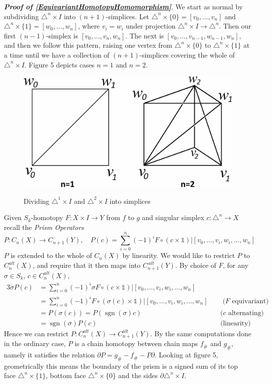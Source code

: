 \documentclass[11pt,a4paper,twoside]{article}
\theoremstyle{plain}
\theoremstyle{definition}
\theoremstyle{definition}
\theoremstyle{definition}
\theoremstyle{definition}
\theoremstyle{definition}
\DeclareMathOperator{\sgn}{sgn}
\begin{document}
\textbf{\emph{Proof of \ref{EquivariantHomotopyHomomorphism}}}.
We start as normal by subdividing $\triangle^n\times I$ into $(n\!+\!1)$-simplices. Let $\triangle^n\times\{0\}=[v_0,\dots,v_n]$ and $\triangle^n\times\{1\}=[w_0,\dots,w_n]$, where $v_i=w_i$ under projection $\triangle^n\times I\rightarrow\triangle^n$. Then our first $(n\!-\!1)$-simplex is $[v_0,\dots,v_n,w_n]$. The next is $[v_0,\dots,v_{n\!-\!1},w_{n\!-\!1},w_n]$, and then we follow this pattern, raising one vertex from $\triangle^n\!\times\!\{0\}$ to $\triangle^n\!\times\!\{1\}$ at a time until we have a collection of $(n\!+\!1)$-simplices covering the whole of $\triangle^n\times I$. Figure 5 depicts cases $n\!=\!1$ and $n\!=\!2$.
\begin{figure}
\centering
\includegraphics[scale=0.15]{Images/PrismSimplices.jpg}
\label{fig:PrismSimplices}
\caption{Dividing $\triangle^1\times I$ and $\triangle^2\times I$ into simplices}
\end{figure}

Given $S_k$-homotopy $F\!:\!X\!\times\! I\!\rightarrow\!Y$ from $f$ to $g$ and singular simplex $c\!:\!\triangle^n\!\rightarrow\! X$ recall the \emph{Prism Operators}
$$P\!:\!C_n(X)\!\rightarrow\!C_{n\!+\!1}(Y), \quad P(c)=\sum_{i=0}^{n}(-1)^iF\circ(c\times\mathbb{1})|{[v_0,\dots,v_i,w_i,\dots,w_n]}$$
$P$ is extended to the whole of $C_n(X)$ by linearity. We would like to restrict $P$ to $C_n^{alt}(X)$, and require that it then maps into $C_{n\!+\!1}^{\,alt}(Y)$. By choice of $F$, for any $\sigma\in S_k,\,c\in C_n^{alt}(X)$,
\begin{alignat*}{3}
\sigma P(c) &= \sum_{i=0}^{n}(-1)^i\sigma F\circ(c\times\mathbb{1})|[v_0,\dots,v_i,w_i,\dots,w_n] & \\
&      =\sum_{i=0}^{n}(-1)^iF\circ(\sigma(c)\times\mathbb{1})|[v_0,\dots,v_i,w_i,\dots,w_n]  \quad & \text{ ($F$ equivariant)}\\
&      =P(\sigma(c))=P(\sgn(\sigma)c) & \text{($c$ alternating)}\\
&      =\sgn(\sigma)P(c)  & \text{(linearity)}
\end{alignat*}
Hence we can restrict $P\!:\!C_n^{alt}(X)\rightarrow C_{n\!+\!1}^{alt}(Y)$. By the same computations done in the ordinary case, $P$ is a chain homotopy between chain maps $f_\#$ and $g_\#$, namely it satisfies the relation $\partial P =g_\# - f_\#-P\partial$. Looking at figure 5, geometrically this means the boundary of the prism is a signed sum of its top face $\triangle^n\times\{1\}$, bottom face $\triangle^n\times\{0\}$ and the sides $\partial\triangle^n\times I$.
\end{document}
